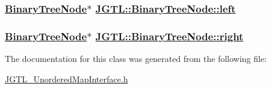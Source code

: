 \hypertarget{class_j_g_t_l_1_1_binary_tree_node_03864227fd9c612d6a5de7bb6a083fb6}{
\subsubsection[left]{\setlength{\rightskip}{0pt plus 5cm}\hyperlink{class_j_g_t_l_1_1_binary_tree_node}{Binary\-Tree\-Node}$\ast$ \hyperlink{class_j_g_t_l_1_1_binary_tree_node_03864227fd9c612d6a5de7bb6a083fb6}{JGTL::Binary\-Tree\-Node::left}}}
\label{class_j_g_t_l_1_1_binary_tree_node_03864227fd9c612d6a5de7bb6a083fb6}


\hypertarget{class_j_g_t_l_1_1_binary_tree_node_d4db6b50b55ba590ea99f5e64f321d37}{
\subsubsection[right]{\setlength{\rightskip}{0pt plus 5cm}\hyperlink{class_j_g_t_l_1_1_binary_tree_node}{Binary\-Tree\-Node}$\ast$ \hyperlink{class_j_g_t_l_1_1_binary_tree_node_d4db6b50b55ba590ea99f5e64f321d37}{JGTL::Binary\-Tree\-Node::right}}}
\label{class_j_g_t_l_1_1_binary_tree_node_d4db6b50b55ba590ea99f5e64f321d37}




The documentation for this class was generated from the following file:\begin{CompactItemize}
\item 
\hyperlink{_j_g_t_l___unordered_map_interface_8h}{JGTL\_\-Unordered\-Map\-Interface.h}\end{CompactItemize}
